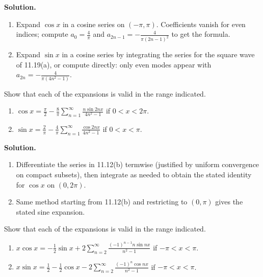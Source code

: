 \noindent\textbf{Solution.}
\begin{enumerate}[label=(\alph*)]
\item Expand $\cos x$ in a cosine series on $(-\pi,\pi)$. Coefficients vanish for even indices; compute $a_0=\tfrac{4}{\pi}$ and $a_{2n-1}=-\tfrac{4}{\pi(2n-1)^2}$ to get the formula.
\item Expand $\sin x$ in a cosine series by integrating the series for the square wave of 11.19(a), or compute directly: only even modes appear with $a_{2n}= -\tfrac{4}{\pi(4n^2-1)}$.
\end{enumerate}

\begin{problembox}
Show that each of the expansions is valid in the range indicated.
\begin{enumerate}[label=(\alph*)]
\item $\cos x = \frac{\pi}{2} - \frac{8}{\pi} \sum_{n=1}^\infty \frac{n \sin 2nx}{4n^2 - 1}$ if $0 < x < 2\pi$.
\item $\sin x = \frac{2}{\pi} - \frac{4}{\pi} \sum_{n=1}^\infty \frac{\cos 2nx}{4n^2 - 1}$ if $0 < x < \pi$.
\end{enumerate}
\end{problembox}

\noindent\textbf{Solution.}
\begin{enumerate}[label=(\alph*)]
\item Differentiate the series in 11.12(b) termwise (justified by uniform convergence on compact subsets), then integrate as needed to obtain the stated identity for $\cos x$ on $(0,2\pi)$.
\item Same method starting from 11.12(b) and restricting to $(0,\pi)$ gives the stated sine expansion.
\end{enumerate}

\begin{problembox}
Show that each of the expansions is valid in the range indicated.
\begin{enumerate}[label=(\alph*)]
\item $x \cos x = -\frac{1}{2} \sin x + 2 \sum_{n=2}^\infty \frac{(-1)^{n-1} n \sin nx}{n^2 - 1}$ if $-\pi < x < \pi$.
\item $x \sin x = \frac{1}{2} - \frac{1}{2} \cos x - 2 \sum_{n=2}^\infty \frac{(-1)^n \cos nx}{n^2 - 1}$ if $-\pi < x < \pi$.
\end{enumerate}
\end{problembox}

